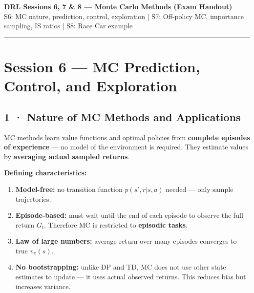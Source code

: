 \documentclass[11pt,a4paper]{article}
\begin{document}
\begin{center}
  {\large\bfseries DRL Sessions 6, 7 \& 8 — Monte Carlo Methods (Exam Handout)}\\[2pt]
  {\small S6: MC nature, prediction, control, exploration \quad|\quad
   S7: Off-policy MC, importance sampling, IS ratios \quad|\quad
   S8: Race Car example}
\end{center}
\hrule\vspace{6pt}

\section*{Session 6 — MC Prediction, Control, and Exploration}

\subsection*{1 · Nature of MC Methods and Applications}

\begin{tcolorbox}[defn={What is Monte Carlo in RL?}]
MC methods learn value functions and optimal policies from \textbf{complete episodes of
experience} — no model of the environment is required. They estimate values by
\textbf{averaging actual sampled returns}.
\end{tcolorbox}

\textbf{Defining characteristics:}
\begin{enumerate}
  \item \textbf{Model-free:} no transition function $p(s',r|s,a)$ needed — only sample trajectories.
  \item \textbf{Episode-based:} must wait until the end of each episode to observe the full return $G_t$.
    Therefore MC is restricted to \textbf{episodic tasks}.
  \item \textbf{Law of large numbers:} average return over many episodes converges to true $v_\pi(s)$.
  \item \textbf{No bootstrapping:} unlike DP and TD, MC does not use other state estimates to update —
    it uses actual observed returns. This reduces bias but increases variance.
\end{enumerate}
\end{document}
